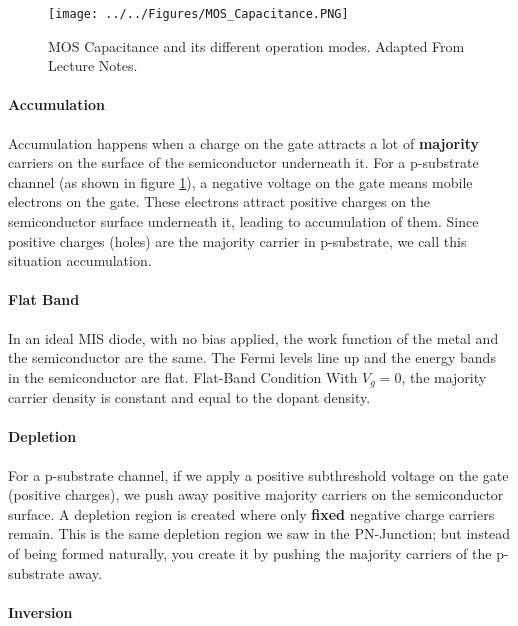 \begin{figure}[H]
    \centering
    \texttt{[image: ../../Figures/MOS\_Capacitance.PNG]}
    \caption{MOS Capacitance and its different operation modes. Adapted From Lecture Notes.}
    \label{fig:MOS_Capacitance}
\end{figure}

\paragraph{Accumulation}

Accumulation happens when a charge on the gate attracts a lot of \textbf{majority} carriers on the surface of the semiconductor underneath it. For a p-substrate channel (as shown in figure \ref{fig:MOS_Capacitance}), a negative voltage on the gate means mobile electrons on the gate. These electrons attract positive charges on the semiconductor surface underneath it, leading to accumulation of them. Since positive charges (holes) are the majority carrier in p-substrate, we call this situation accumulation. 

\paragraph{Flat Band}

In an ideal MIS diode, with no bias applied, the work function of the metal and the semiconductor are the same. The Fermi levels line up and the energy bands in the semiconductor are flat. Flat-Band Condition
With $V_g = 0$, the majority carrier density is constant and equal to the dopant density.

\paragraph{Depletion}

For a p-substrate channel, if we apply a positive subthreshold voltage on the gate (positive charges), we push away positive majority carriers on the semiconductor surface. A depletion region is created where only \textbf{fixed} negative charge carriers remain. This is the same depletion region we saw in the PN-Junction; but instead of being formed naturally, you create it by pushing the majority carriers of the p-substrate away. 

\paragraph{Inversion}

